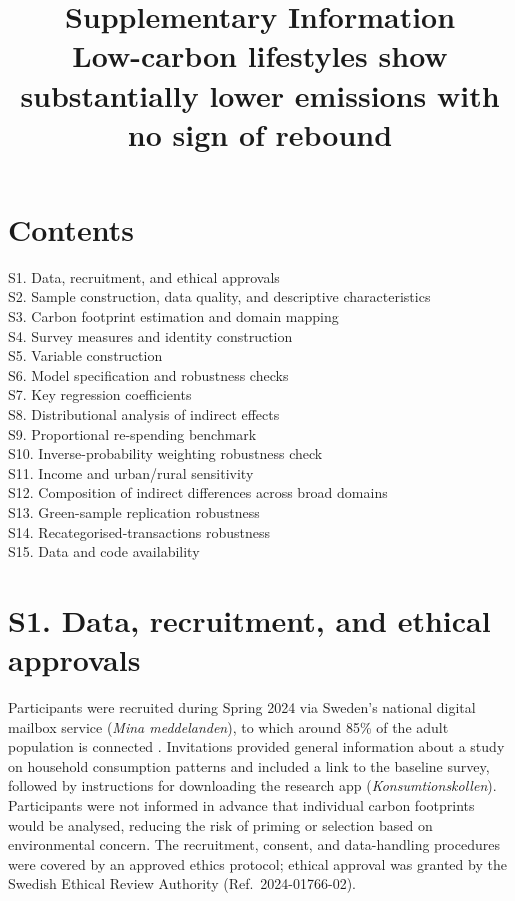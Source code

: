 \documentclass[12pt]{article}
\title{Supplementary Information\\
Low-carbon lifestyles show substantially lower emissions with no sign of rebound}
\date{}
\begin{document}
\maketitle
\onehalfspacing

\section*{Contents}
S1. Data, recruitment, and ethical approvals \\
S2. Sample construction, data quality, and descriptive characteristics \\
S3. Carbon footprint estimation and domain mapping \\
S4. Survey measures and identity construction \\
S5. Variable construction \\
S6. Model specification and robustness checks \\
S7. Key regression coefficients \\
S8. Distributional analysis of indirect effects \\
S9. Proportional re-spending benchmark \\
S10. Inverse-probability weighting robustness check \\
S11. Income and urban/rural sensitivity \\
S12. Composition of indirect differences across broad domains \\
S13. Green-sample replication robustness \\
S14. Recategorised-transactions robustness \\
S15. Data and code availability

\section*{S1. Data, recruitment, and ethical approvals}

Participants were recruited during Spring 2024 via Sweden's national digital mailbox service (\emph{Mina meddelanden}), to which around 85\% of the adult population is connected \citep{digg_mina_meddelanden_2025w48,scb_befolk_manad_ckm_2025}.
Invitations provided general information about a study on household consumption patterns and included a link to the baseline survey, followed by instructions for downloading the research app (\emph{Konsumtionskollen}). Participants were not informed in advance that individual carbon footprints would be analysed, reducing the risk of priming or selection based on environmental concern. The recruitment, consent, and data-handling procedures were covered by an approved ethics protocol; ethical approval was granted by the Swedish Ethical Review Authority (Ref.\ 2024-01766-02).
\end{document}
